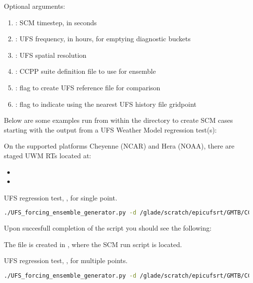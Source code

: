 Optional arguments:
\begin{enumerate}
\item {}: SCM timestep, in seconds
\item {}: UFS frequency, in hours, for emptying diagnostic buckets
\item {}: UFS spatial resolution
\item {}: CCPP suite definition file to use for ensemble
\item {}: flag to create UFS reference file for comparison
\item {}: flag to indicate using the nearest UFS history file gridpoint
\end{enumerate}

Below are some examples run from within the  directory to create SCM cases starting with the output from a UFS Weather Model regression test(s):

On the supported platforms Cheyenne (NCAR) and Hera (NOAA), there are staged UWM RTs located at:
\begin{itemize}
\item {}
\item {}
\end{itemize}

UFS regression test, , for single point.
\begin{lstlisting}[language=bash]
./UFS_forcing_ensemble_generator.py -d /glade/scratch/epicufsrt/GMTB/CCPP-SCM/UFS_RTs/control_c192/ -sc --C_RES 192 -dt 360 -fhz 12 -n control_c192 -lons 300 -lats 34
\end{lstlisting}

Upon succesfull completion of the script you should see the following:

The file  is created in , where the SCM run script is located.

UFS regression test, , for multiple points.
\begin{lstlisting}[language=bash]
./UFS_forcing_ensemble_generator.py -d /glade/scratch/epicufsrt/GMTB/CCPP-SCM/UFS_RTs/control_c384/ -sc --C_RES 384 -dt 225 -fhz 6 -n control_c384 -lons 300 300 300 300 -lats 34 35 35 37
\end{lstlisting}

